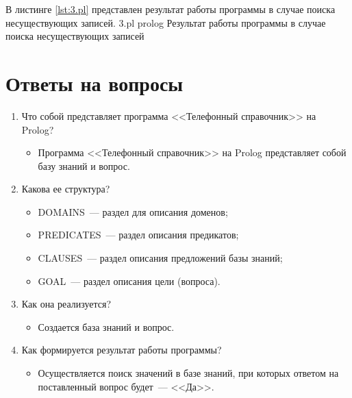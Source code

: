 В листинге \ref{lst:3.pl} представлен результат работы программы в случае поиска несуществующих записей.
	{3.pl}
	{prolog}
	{Результат работы программы в случае поиска несуществующих записей}

\section{Ответы на вопросы}

\begin{enumerate}
	\item Что собой представляет программа <<Телефонный справочник>> на Prolog?
	\begin{itemize}
		\item Программа <<Телефонный справочник>> на Prolog представляет собой базу знаний и вопрос.
	\end{itemize}
	\item Какова ее структура?
	\begin{itemize}
		\item DOMAINS~--- раздел для описания доменов;
		\item PREDICATES~--- раздел описания предикатов;
		\item CLAUSES~--- раздел описания предложений базы знаний;
		\item GOAL~--- раздел описания цели (вопроса).
	\end{itemize}
	\item Как она реализуется?
	\begin{itemize}
		\item Создается база знаний и вопрос.
	\end{itemize}
	\item Как формируется результат работы программы?
	\begin{itemize}
		\item Осуществляется поиск значений в базе знаний, при которых ответом на поставленный вопрос будет~--- <<Да>>.
	\end{itemize}
\end{enumerate}
